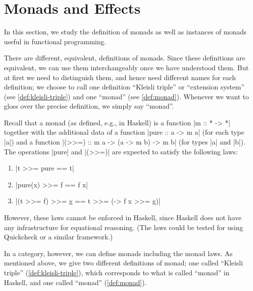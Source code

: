 
\chapter{Monads and Effects}
\label{sec:monads}

In this section, we study the definition of monads as well as instances of monads useful in functional programming.

There are different, equivalent, definitions of monads.
Since these definitions are equivalent, we can use them interchangeably once we have understood them.
But at first we need to distinguish them, and hence need different names for each definition; we choose to call one definition ``Kleisli triple'' or ``extension system'' (see \cref{def:kleisli-triple}) and one ``monad'' (see \cref{def:monad}).
Whenever we want to gloss over the precise definition, we simply say ``monad''.


Recall that a monad (as defined, e.g., in Haskell) is a function |m :: * -> *| together with the additional data of a function |pure :: a -> m a| (for each type |a|) and a function |(>>=) :: m a -> (a -> m b) -> m b| (for types |a| and |b|).
The operations |pure| and |(>>=)| are expected to satisfy the following laws:
\begin{enumerate}
\item |t >>= pure == t| %
\item |pure(x) >>= f == f x| %
\item |(t >>= f) >>= g == t >>= (\x -> f x >>= g)|%
\end{enumerate}
However, these laws cannot be enforced in Haskell, since Haskell does not have any infrastructure for equational reasoning.
(The laws could be tested for using Quickcheck or a similar framework.)

In a category, however, we can define monads including the monad laws.
As mentioned above, we give two different definitions of monad;
one called ``Kleisli triple'' (\cref{def:kleisli-triple}), which corresponds to what is called ``monad'' in Haskell,
and one called ``monad'' (\cref{def:monad}). 


